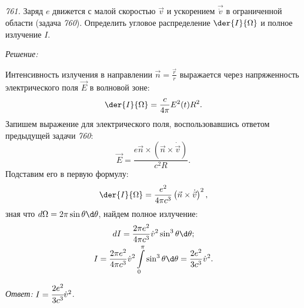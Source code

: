 \newpage
\emph{761.} Заряд \( e \) движется с малой скоростью \( \vec{v} \) и ускорением
\( \vec{\dot{v}} \) в ограниченной области (задача \emph{760}). Определить
угловое распределение \( \der{I}{\Omega} \) и полное излучение \( I \).

\vspace*{2em}
\emph{Решение:}

Интенсивность излучения в направлении \( \vec{n} = \frac{\vec{r}}{r} \)
выражается через напряженность электрического поля \( \vec{E} \) в волновой
зоне:
\[
    \der{I}{\Omega} = \frac{c}{4\pi} E^2(t)R^2.
\]
Запишем выражение для электрического поля, воспользовавшись ответом предыдущей
задачи \emph{760}:
\[
    \vec{E} = \frac{e\vec{n}\times\left(\vec{n}\times\dot{\vec{v}}\right)}
    {c^2R}.
\]
Подставим его в первую формулу: 
\[
    \der{I}{\Omega} = \frac{e^2}{4\pi c^3} \left( \vec{n}\times \dot{\vec{v}}
    \right)^2,
\]
зная что \( d\Omega = 2\pi\sin\theta\d\theta \), найдем полное излучение:
\begin{gather*}
    dI = \frac{2\pi e^2}{4\pi c^3} \dot{v}^2 \sin^3\theta\d\theta; \\
    I = \frac{2\pi e^2}{4\pi c^3}\dot{v}^2\int\limits_0^\pi\sin^3\theta\d\theta
    = \frac{2e^2}{3c^3}\dot{v}^2.
\end{gather*}

\vspace*{2em}
\emph{Ответ:} \( I = \cfrac{2e^2}{3c^3}\dot{v}^2 \).

